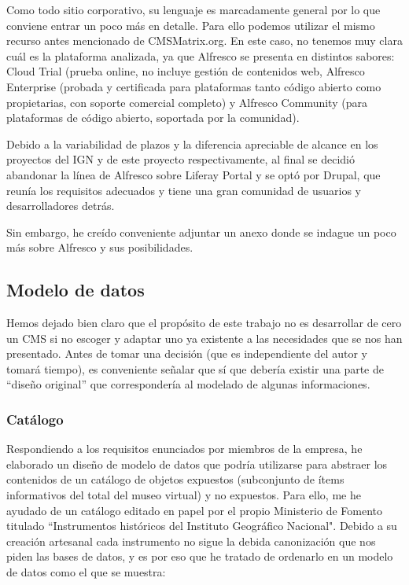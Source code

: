 \par Como todo sitio corporativo, su lenguaje es marcadamente general por lo que conviene entrar un poco más en detalle. Para ello podemos utilizar el mismo recurso antes mencionado de CMSMatrix.org\cite{refrences:alfrescocmsmat}. En este caso, no tenemos muy clara cuál es la plataforma analizada, ya que Alfresco se presenta en distintos sabores\cite{references:alfrescocomp}: Cloud Trial (prueba online, no incluye gestión de contenidos web, Alfresco Enterprise (probada y certificada para plataformas tanto código abierto como propietarias, con soporte comercial completo) y Alfresco Community (para plataformas de código abierto, soportada por la comunidad).

\par Debido a la variabilidad de plazos y la diferencia apreciable de alcance en los proyectos del IGN y de este proyecto respectivamente, al final se decidió abandonar la línea de Alfresco sobre Liferay Portal y se optó por Drupal, que reunía los requisitos adecuados y tiene una gran comunidad de usuarios y desarrolladores detrás.

Sin embargo, he creído conveniente adjuntar un anexo donde se indague un poco más sobre Alfresco y sus posibilidades.

\subsection{Modelo de datos}
\par Hemos dejado bien claro que el propósito de este trabajo no es desarrollar de cero un CMS si no escoger y adaptar uno ya existente a las necesidades que se nos han presentado. Antes de tomar una decisión (que es independiente del autor y tomará tiempo), es conveniente señalar que sí que debería existir una parte de ``diseño original'' que correspondería al modelado de algunas informaciones. 


\subsubsection{Catálogo}
\par Respondiendo a los requisitos enunciados por miembros de la empresa, he elaborado un diseño de modelo de datos que podría utilizarse para abstraer los contenidos de un catálogo de objetos expuestos (subconjunto de ítems informativos del total del museo virtual) y no expuestos.
Para ello, me he ayudado de un catálogo editado en papel por el propio Ministerio de Fomento titulado ``Instrumentos históricos del Instituto Geográfico Nacional". Debido a su creación artesanal cada instrumento no sigue la debida canonización que nos piden las bases de datos, y es por eso que he tratado de ordenarlo en un modelo de datos como el que se muestra:


